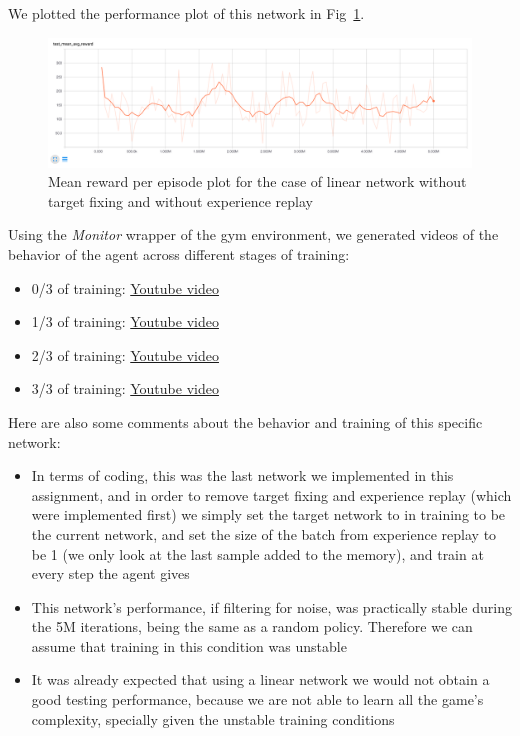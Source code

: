 \documentclass{article}
\begin{document}
We plotted the performance plot of this network in Fig~\ref{fig:r_q2}.


\begin{figure}[h] 
  \centering
  \includegraphics[width=1.0\textwidth]{images/r_q2} 
  \caption{Mean reward per episode plot for the case of linear network without target fixing and without experience replay}
  \label{fig:r_q2}
\end{figure}

Using the \textit{Monitor} wrapper of the gym environment, we generated videos of the behavior of the agent across different stages of training:

\begin{itemize}
  \item 0/3 of training: \href{https://youtu.be/i_g-5hSg1L0}{Youtube video}
  \item 1/3 of training: \href{https://youtu.be/89zyC4tFDcE}{Youtube video}
  \item 2/3 of training: \href{https://youtu.be/AeCbh3gh-gg}{Youtube video}
  \item 3/3 of training: \href{https://youtu.be/mXS99LlisDc}{Youtube video}
\end{itemize}

Here are also some comments about the behavior and training of this specific network:

\begin{itemize}
  \item In terms of coding, this was the last network we implemented in this assignment, and in order to remove target fixing and experience replay (which were implemented first) we simply set the target network to in training to be the current network, and set the size of the batch from experience replay to be 1 (we only look at the last sample added to the memory), and train at every step the agent gives
  \item This network's performance, if filtering for noise, was practically stable during the 5M iterations, being the same as a random policy. Therefore we can assume that training in this condition was unstable
  \item It was already expected that using a linear network we would not obtain a good testing performance, because we are not able to learn all the game's complexity, specially given the unstable training conditions 
\end{itemize}
\end{document}
